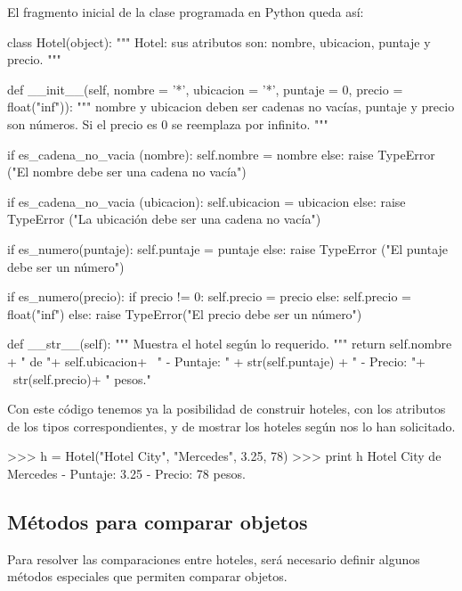 El fragmento inicial de la clase programada en Python queda así:

\begin{codigo-python}
class Hotel(object):
    """ Hotel: sus atributos son: nombre, ubicacion, puntaje y precio. """

    def __init__(self, nombre = '*', ubicacion = '*',
                 puntaje = 0, precio = float("inf")):
        """ nombre y ubicacion deben ser cadenas no vacías,
            puntaje y precio son números.
            Si el precio es 0 se reemplaza por infinito. """

        if es_cadena_no_vacia (nombre):
            self.nombre = nombre
        else:
            raise TypeError ("El nombre debe ser una cadena no vacía")

        if es_cadena_no_vacia (ubicacion):
            self.ubicacion = ubicacion
        else:
            raise TypeError ("La ubicación debe ser una cadena no vacía")

        if es_numero(puntaje):
            self.puntaje = puntaje
        else:
            raise TypeError ("El puntaje debe ser un número")

        if es_numero(precio):
            if precio != 0:
                self.precio = precio
            else:
                self.precio = float("inf")
        else:
            raise TypeError("El precio debe ser un número")

    def __str__(self):
        """ Muestra el hotel según lo requerido. """
        return self.nombre + " de "+ self.ubicacion+ \
                " - Puntaje: " + str(self.puntaje) + " - Precio: "+ \
                str(self.precio)+ " pesos."
\end{codigo-python}

Con este código tenemos ya la posibilidad de construir hoteles, con los
atributos de los tipos correspondientes, y de mostrar los hoteles según nos
lo han solicitado.

\begin{codigo-python-sn}
>>> h = Hotel("Hotel City", "Mercedes", 3.25, 78)
>>> print h
Hotel City de Mercedes - Puntaje: 3.25 - Precio: 78 pesos.
\end{codigo-python-sn}

\subsection{Métodos para comparar objetos}

Para resolver las comparaciones entre hoteles, será necesario definir
algunos métodos especiales que permiten comparar objetos.

